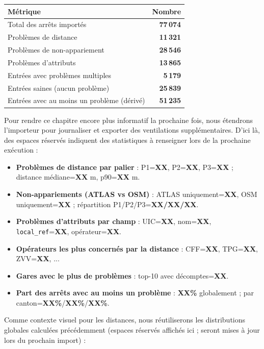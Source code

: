\begin{center}
\small
\begin{tabular}{l r}
\toprule
Métrique & Nombre \\
\midrule
Total des arrêts importés & \textbf{77\,074} \\
Problèmes de distance & \textbf{11\,321} \\
Problèmes de non-appariement & \textbf{28\,546} \\
Problèmes d'attributs & \textbf{13\,865} \\
Entrées avec problèmes multiples & \textbf{5\,179} \\
Entrées saines (aucun problème) & \textbf{25\,839} \\
\midrule
Entrées avec au moins un problème (dérivé) & \textbf{51\,235} \\
\bottomrule
\end{tabular}
\end{center}

\noindent Pour rendre ce chapitre encore plus informatif la prochaine fois, nous étendrons l'importeur pour journaliser et exporter des ventilations supplémentaires. D'ici là, des espaces réservés indiquent des statistiques à renseigner lors de la prochaine exécution :

\begin{itemize}
  \item \textbf{Problèmes de distance par palier} : P1=\textbf{XX}, P2=\textbf{XX}, P3=\textbf{XX} ; distance médiane=\textbf{XX} m, p90=\textbf{XX} m.
  \item \textbf{Non-appariements (ATLAS vs OSM)} : ATLAS uniquement=\textbf{XX}, OSM uniquement=\textbf{XX} ; répartition P1/P2/P3=\textbf{XX/XX/XX}.
  \item \textbf{Problèmes d'attributs par champ} : UIC=\textbf{XX}, nom=\textbf{XX}, \texttt{local\_ref}=\textbf{XX}, opérateur=\textbf{XX}.
  \item \textbf{Opérateurs les plus concernés par la distance} : CFF=\textbf{XX}, TPG=\textbf{XX}, ZVV=\textbf{XX}, ...
  \item \textbf{Gares avec le plus de problèmes} : top-10 avec décomptes=\textbf{XX}.
  \item \textbf{Part des arrêts avec au moins un problème} : \textbf{XX\%} globalement ; par canton=\textbf{XX\%}/\textbf{XX\%}/\textbf{XX\%}.
\end{itemize}

\noindent Comme contexte visuel pour les distances, nous réutiliserons les distributions globales calculées précédemment (espaces réservés affichés ici ; seront mises à jour lors du prochain import) :


